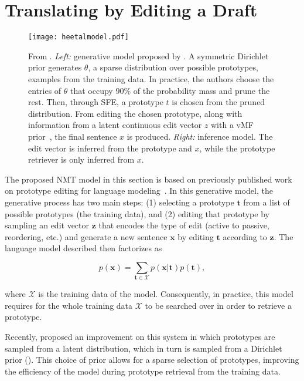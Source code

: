 \section{Translating by Editing a Draft}
\label{sec:draftedits}

\begin{figure}[t]
    \centering
    \texttt{[image: heetalmodel.pdf]}
    \caption{From \citet{he2020LearningSparsePrototypes}. {\it Left:}
    generative model proposed by
    \citet{he2020LearningSparsePrototypes}. A symmetric Dirichlet
    prior generates $\theta$, a sparse distribution over possible
    prototypes, \ie examples from the training data. In practice, the
    authors choose the entries of $\theta$ that occupy 90\% of the
    probability mass and prune the rest. Then, through SFE, a
    prototype $t$ is chosen from the pruned distribution. From
    editing the chosen prototype, along with information from a
    latent continuous edit vector $z$ with a vMF
    prior~\citep{s-vae18}, the final sentence
    $x$ is produced. {\it Right:} inference model. The edit
    vector is inferred from the prototype and $x$, while the
    prototype retriever is only inferred from $x$.
    \label{fig:he2020LearningSparsePrototypes}}
\end{figure}

The proposed NMT model in this section is based on previously
published work on prototype editing for language
modeling~\citep{guu2018GeneratingSentencesEditing,
he2020LearningSparsePrototypes}. In this generative model, the
generative process has two main steps: (1) selecting a prototype
$\bm{t}$ from a list of possible prototypes (\eg the training data),
and (2) editing that prototype by sampling an edit vector $\bm{z}$
that encodes the type of edit (\eg active to passive, reordering,
etc.) and generate a new sentence $\bm{x}$ by editing $\bm{t}$
according to $\bm{z}$. The language model described then factorizes
as

\begin{equation}
    p(\bm{x}) = \sum_{\bm{t} \in \mathcal{X}} p(\bm{x} | \bm{t}) p(\bm{t}),
\end{equation}

\noindent where $\mathcal{X}$ is the training data of the model.
Consequently, in practice, this model requires for the whole training
data $\mathcal{X}$ to be searched over in order to retrieve a
prototype.

Recently, \citet{he2020LearningSparsePrototypes} proposed an
improvement on this system in which prototypes are sampled from a
latent distribution, which in turn is sampled from a Dirichlet prior
(). This choice of prior
allows for a sparse selection of prototypes, improving the efficiency
of the model during prototype retrieval from the training data.

